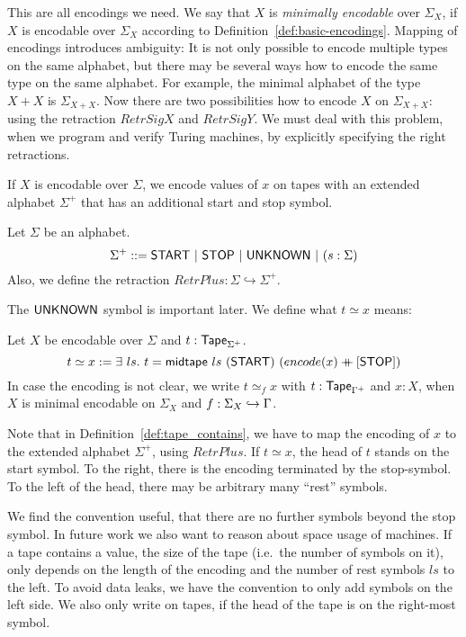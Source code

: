 This are all encodings we need.  We say that $X$ is \textit{minimally encodable} over $\Sigma_X$, if $X$ is encodable over $\Sigma_X$ according to
Definition~\ref{def:basic-encodings}.  Mapping of encodings introduces ambiguity: It is not only possible to encode multiple types on the same
alphabet, but there may be several ways how to encode the same type on the same alphabet.  For example, the minimal alphabet of the type $X+X$ is
$\Sigma_{X+X}$.  Now there are two possibilities how to encode $X$ on $\Sigma_{X+X}$: using the retraction $RetrSigX$ and $RetrSigY$.  We must deal
with this problem, when we program and verify Turing machines, by explicitly specifying the right retractions.

If $X$ is encodable over $\Sigma$, we encode values of $x$ on tapes with an extended alphabet $\Sigma^+$ that has an additional start and stop symbol.
%
\begin{definition}[$\Sigma^+$][boundary]
  Let $\Sigma$ be an alphabet.
  \[
    \Sigma^+ ::= \mathsf{START} ~|~ \mathsf{STOP} ~|~ \mathsf{UNKNOWN} ~|~ (s: \Sigma)
  \]
  Also, we define the retraction $RetrPlus : \Sigma \hookrightarrow \Sigma^+$.
\end{definition}
The $\mathsf{UNKNOWN}$ symbol is important later. We define what $t \simeq x$ means:
\begin{definition}
  \label{def:tape_contains}
  Let $X$ be encodable over $\Sigma$ and $t : \mathsf{Tape}_{\Sigma^+}$.
  \[
    t \simeq x := \exists~ls.~
    t = \mathsf{midtape}~ls~(\mathsf{START})~(encode(x) \mathbin{+\mkern-10mu+} [\mathsf{STOP}])
  \]
  In case the encoding is not clear, we write $t \simeq_f x$ with $t:\mathsf{Tape}_{\Gamma^+}$ and $x:X$, when $X$ is minimal encodable on $\Sigma_X$ and
  $f: \Sigma_X \hookrightarrow \Gamma$.
\end{definition}

Note that in Definition~\ref{def:tape_contains}, we have to map the encoding of $x$ to the extended alphabet $\Sigma^+$, using $RetrPlus$.  If
$t \simeq x$, the head of $t$ stands on the start symbol.  To the right, there is the encoding terminated by the stop-symbol.  To the left of the
head, there may be arbitrary many ``rest'' symbols.

We find the convention useful, that there are no further symbols beyond the stop symbol.  In future work we also want to reason about space usage of
machines.  If a tape contains a value, the size of the tape (i.e.\ the number of symbols on it), only depends on the length of the encoding and the
number of rest symbols $ls$ to the left.  To avoid data leaks, we have the convention to only add symbols on the left side.  We also only write on
tapes, if the head of the tape is on the right-most symbol.

